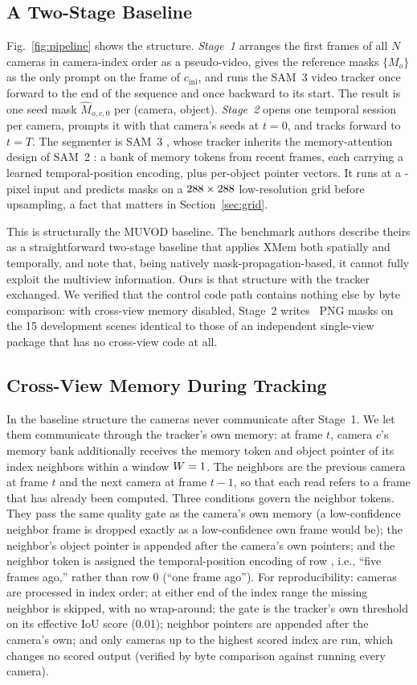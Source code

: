 \documentclass[journal]{IEEEtran}
\newcommand{\cini}{\ensuremath{c_{\mathrm{ini}}}}
\begin{document}
\subsection{A Two-Stage Baseline}
\label{sec:twostage}
Fig.~\ref{fig:pipeline} shows the structure. \emph{Stage~1} arranges the first
frames of all $N$ cameras in camera-index order as a pseudo-video, gives the
reference masks $\{M_{o}\}$ as the only prompt on the frame of \cini, and runs
the SAM~3 video tracker once forward to the end of the sequence and once
backward to its start. The result is one seed mask $\hat{M}_{o,c,0}$ per
(camera, object). \emph{Stage~2} opens one temporal session per camera, prompts
it with that camera's seeds at $t=0$, and tracks forward to $t=T$. The segmenter
is SAM~3 \cite{sam3}, whose tracker inherits the memory-attention design of
SAM~2 \cite{sam2}: a bank of memory tokens from recent frames, each carrying a
learned temporal-position encoding, plus per-object pointer vectors. It runs at
a \modelInput-pixel input and predicts masks on a $288\times288$
low-resolution grid before upsampling, a fact that matters in
Section~\ref{sec:grid}.

This is structurally the MUVOD baseline. The benchmark authors describe theirs
as a straightforward two-stage baseline that applies XMem both spatially and
temporally, and note that, being natively mask-propagation-based, it cannot
fully exploit the multiview information. Ours is that structure
with the tracker exchanged. We verified that the control code path contains
nothing else by byte comparison: with cross-view memory disabled, Stage~2
writes \nBytePNG\ PNG masks on the 15 development scenes identical to those of
an independent single-view package that has no cross-view code at all.

\subsection{Cross-View Memory During Tracking}
\label{sec:xview}
In the baseline structure the cameras never communicate after Stage~1. We let
them communicate through the tracker's own memory: at frame $t$, camera $c$'s
memory bank additionally receives the memory token and object pointer of its
index neighbors within a window $W=1$. The neighbors are the
previous camera at frame $t$ and the next camera at frame $t-1$, so that each
read refers to a frame that has already been computed. Three conditions govern
the neighbor tokens. They pass the same quality gate as the camera's own
memory (a low-confidence neighbor frame is dropped exactly as a low-confidence
own frame would be); the neighbor's object pointer is appended after the
camera's own pointers; and the neighbor token is assigned the temporal-position
encoding of row \xviewRow, i.e., ``five frames ago,'' rather than row 0
(``one frame ago''). For reproducibility: cameras are processed in index
order; at either end of the index range the missing neighbor is skipped, with
no wrap-around; the gate is the tracker's own threshold on its effective IoU
score (0.01); neighbor pointers are appended after the camera's own; and only
cameras up to the highest scored index are run, which changes no scored output
(verified by byte comparison against running every camera).
\end{document}
